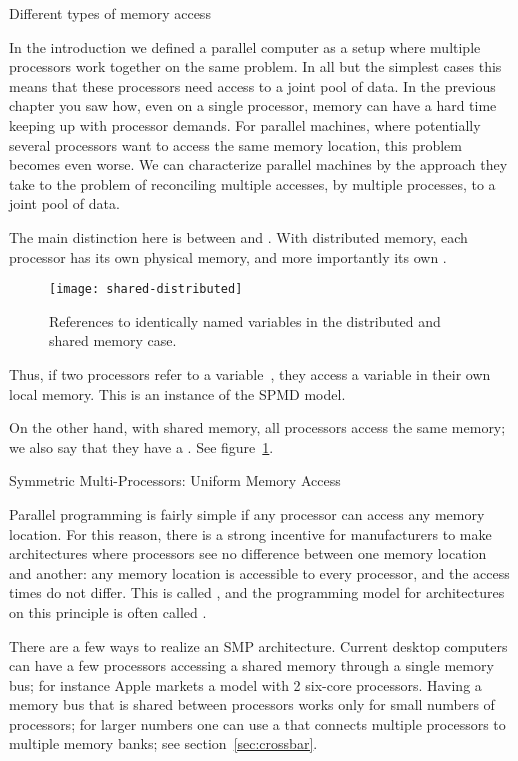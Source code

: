 {Different types of memory access}
\label{sec:mem-access}

In the introduction we defined a parallel computer as a setup where
multiple processors work together on the same problem. In all but the
simplest cases this means that these processors need access to a joint
pool of data. In the previous chapter you saw how, even on a single
processor, memory can have a hard time keeping up with processor demands.
For parallel machines, where potentially several processors
want to access the same memory location, this problem becomes even
worse. We can characterize parallel machines by the approach they take
to the problem of reconciling multiple accesses, by multiple
processes, to a joint pool of data.

The main distinction here is between
 and
. With distributed memory, each processor
has its own physical memory, and more importantly its own
.
\begin{figure}
  \texttt{[image: shared-distributed]}
  \caption{References to identically named variables in the
    distributed and shared memory case.}
  \label{fig:shared-distributed}
\end{figure}
Thus, if two processors refer to a variable~, they access a
variable in their own local memory.
This is an instance of the \ac{SPMD} model.

On the other hand, with shared
memory, all processors access the same memory; we also say that they
have a .
See figure~\ref{fig:shared-distributed}.

 {Symmetric Multi-Processors: Uniform Memory Access}
\label{sec:uma}

Parallel programming is fairly simple if any processor can access any
memory location. For this reason, there is a strong incentive for
manufacturers to make architectures where processors see no difference
between one memory location and another: any memory location is
accessible to every processor, and
the access times do not differ. This is called , and 
the programming model for
architectures on this principle is often called .

There are a few ways to realize an SMP architecture.  Current desktop
computers can have a few processors accessing a shared memory through
a single memory bus; for instance Apple markets a model with 2
six-core processors. Having a memory bus that is shared between
processors works only for small numbers of processors; for larger
numbers one can use a  that connects multiple
processors to multiple memory banks; see section~\ref{sec:crossbar}.

